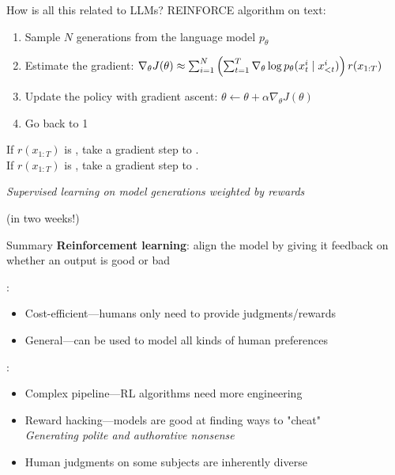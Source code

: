 \documentclass[usenames,dvipsnames,notes,11pt,aspectratio=169,hyperref={colorlinks=true, linkcolor=blue}]{beamer}
\begin{document}
\begin{frame}
    {How is all this related to LLMs?}{}
    REINFORCE algorithm on text:\\
    \begin{enumerate}
        \item Sample $N$ generations from the language model $p_\theta$
        \item Estimate the gradient: 
            $
            \nabla_\theta J(\theta) \approx \sum_{i=1}^N
            \left( \sum_{t=1}^T \nabla_\theta\log p_\theta(x_t^i\mid x_{<t}^i) \right)
            r(x_{1:T}) 
            $
        \item Update the policy with gradient ascent: $\theta \leftarrow \theta + \alpha \nabla_\theta J(\theta)$
        \item Go back to 1
    \end{enumerate}
    \pause

    \begin{mdframed}[backgroundcolor=gray!20, linewidth=0pt, frametitle={What is the algorithm doing?}]
        If $r(x_{1:T})$ is , take a gradient step to .\\ %
        If $r(x_{1:T})$ is , take a gradient step to . %

        {\em Supervised learning on model generations weighted by rewards}
    \end{mdframed}

    \pause
     (in two weeks!)
\end{frame}

\begin{frame}
    {Summary}{}
    \textbf{Reinforcement learning}: align the model by giving it feedback on whether an output is good or bad

    :\\
    \begin{itemize}
        \item Cost-efficient---humans only need to provide judgments/rewards
        \item General---can be used to model all kinds of human preferences
    \end{itemize}

    \pause
    :\\
    \begin{itemize}
        \item Complex pipeline---RL algorithms need more engineering
        \item Reward hacking---models are good at finding ways to "cheat"\\
            {\em Generating polite and authorative nonsense}
        \item Human judgments on some subjects are inherently diverse 
    \end{itemize}
\end{frame}
\end{document}
